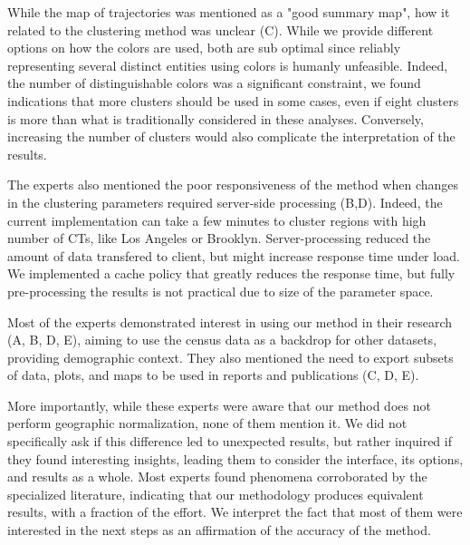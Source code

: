 While the map of trajectories was mentioned as a "good summary map", how it
related to the clustering method was unclear (C). While we provide different
options on how the colors are used, both are sub optimal since reliably
representing several distinct entities using colors is humanly unfeasible.
Indeed, the number of distinguishable colors was a significant constraint, we
found indications that more clusters should be used in some cases, even if eight
clusters is more than what is traditionally considered in these analyses.
Conversely, increasing the number of clusters would also complicate the
interpretation of the results.


The experts also mentioned the poor responsiveness of the method when changes in
the clustering parameters required server-side processing (B,D). Indeed, the
current implementation can take a few minutes to cluster regions with high
number of CTs, like Los Angeles or Brooklyn. Server-processing reduced the
amount of data transfered to client, but might increase response time under
load. We implemented a cache policy that greatly reduces the response time, but
fully pre-processing the results is not practical due to size of the parameter
space.

Most of the experts demonstrated interest in using our method in their research
(A, B, D, E), aiming to use the census data as a backdrop for other datasets,
providing demographic context. They also mentioned the need to export subsets of
data, plots, and maps to be used in reports and publications (C, D, E).


More importantly, while these experts were aware that our method does not
perform geographic normalization, none of them mention it. We did not
specifically ask if this difference led to unexpected results, but rather
inquired if they found interesting insights, leading them to consider the
interface, its options, and results as a whole. Most experts found phenomena
corroborated by the specialized literature, indicating that our methodology
produces equivalent results, with a fraction of the effort. We interpret the
fact that most of them were interested in the next steps as an affirmation of
the accuracy of the method.